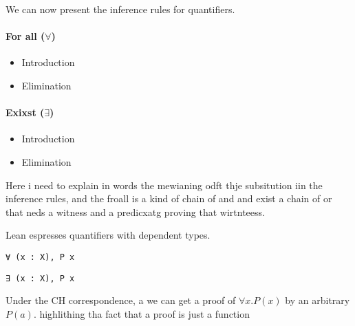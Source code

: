 We can now present the inference rules for quantifiers.
\paragraph{For all ($\forall$)}
\begin{itemize}
    \item Introduction
    \begin{prooftree}
    \end{prooftree}
    \item Elimination
    \begin{prooftree}
    \end{prooftree}
\end{itemize}
\paragraph{Exixst ($\exists$)}
  \begin{itemize}
    \item Introduction
    \begin{prooftree}
    \end{prooftree}
    \item Elimination
    \begin{prooftree}
    \end{prooftree}
\end{itemize}
Here i need to explain in words the mewianing odft thje subsitution iin the inference rules, 
and the froall is a kind of 
chain of and and exist a chain of or that neds a witness and a predicxatg proving that wirtnteess.


\begin{example}
  Lean espresses quantifiers with dependent types.
  \begin{lstlisting}[language=Lean, caption=For All]
  ∀ (x : X), P x
  \end{lstlisting}

  \begin{lstlisting}[language=Lean, caption=Exists]
  ∃ (x : X), P x
  \end{lstlisting}
\end{example}

Under the CH correspondence, a we can get a proof of $\forall x. P(x)$ by an arbitrary $P(a)$.
highlithing tha fact that a proof is just a function


